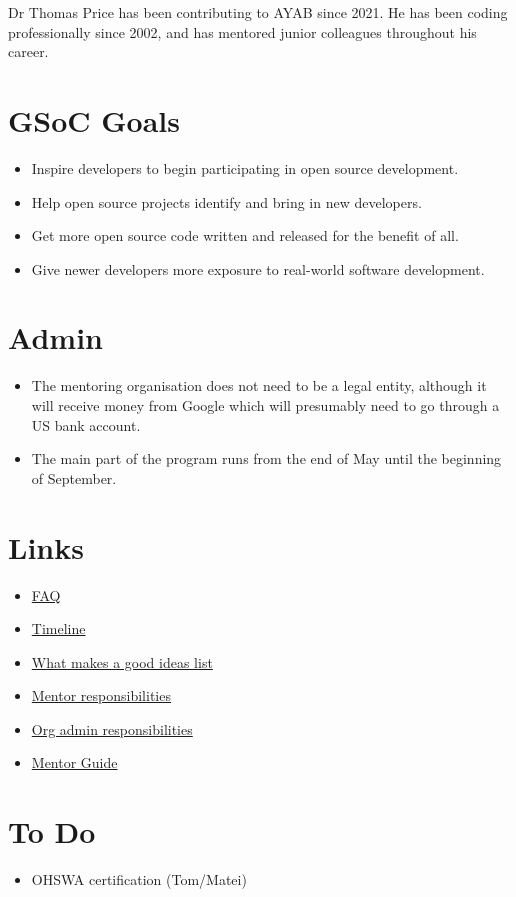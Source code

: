 \documentclass{article}
\begin{document}
Dr Thomas Price has been contributing to AYAB since 2021. He has been coding professionally since 2002, and has mentored junior colleagues throughout his career.


\section{GSoC Goals}

{\itshape
\begin{itemize}
\item Inspire developers to begin participating in open source development.
\item Help open source projects identify and bring in new developers.
\item Get more open source code written and released for the benefit of all.
\item Give newer developers more exposure to real-world software development.
\end{itemize}
}


\section{Admin}

{\itshape 
\begin{itemize}
\item The mentoring organisation does not need to be a legal entity, although it will receive money from Google which will presumably need to go through a US bank account.
\item The main part of the program runs from the end of May until the beginning of September.
\end{itemize}
}


\section{Links}

\begin{itemize}\item \href{https://developers.google.com/open-source/gsoc/faq}{FAQ}
\item \href{https://developers.google.com/open-source/gsoc/timeline}{Timeline}
\item \href{https://google.github.io/gsocguides/mentor/defining-a-project-ideas-list.html}{What makes a good ideas list}
\item \href{https://developers.google.com/open-source/gsoc/help/responsibilities#mentor_responsibilities}{Mentor responsibilities}
\item \href{https://developers.google.com/open-source/gsoc/help/responsibilities#org_admin_responsibilities}{Org admin responsibilities}
\item \href{https://google.github.io/gsocguides/mentor/}{Mentor Guide}
\end{itemize}


\section{To Do}

{\itshape 
\begin{itemize}
\item OHSWA certification (Tom/Matei)
\end{itemize}
}
\end{document}
